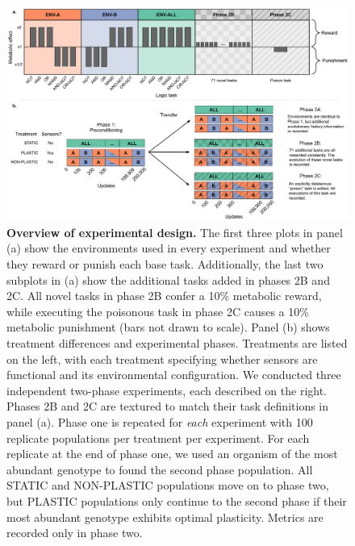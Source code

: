 \begin{figure}[h!]
    \centering
    \includegraphics[width=1\textwidth]{media/experimental-design.pdf}
    \caption{\small
    \textbf{Overview of experimental design.}
    The first three plots in panel (a) show the environments used in every experiment and whether they reward or punish each base task. 
    Additionally, the last two subplots in (a) show the additional tasks added in phases 2B and 2C. 
    All novel tasks in phase 2B confer a 10\% metabolic reward, while executing the poisonous task in phase 2C causes a 10\% metabolic punishment (bars not drawn to scale). 
    Panel (b) shows treatment differences and experimental phases. 
    Treatments are listed on the left, with each treatment specifying whether sensors are functional and its environmental configuration.
    We conducted three independent two-phase experiments, each described on the right.
    Phases 2B and 2C are textured to match their task definitions in panel (a). 
    Phase one is repeated for \textit{each} experiment with 100 replicate populations per treatment per experiment. 
    For each replicate at the end of phase one, we used an organism of the most abundant genotype to found the second phase population. 
    All STATIC and NON-PLASTIC populations move on to phase two, but PLASTIC populations only continue to the second phase if their most abundant genotype exhibits optimal plasticity. 
    Metrics are recorded only in phase two.
    }
    \label{fig:experimental-design}
\end{figure}